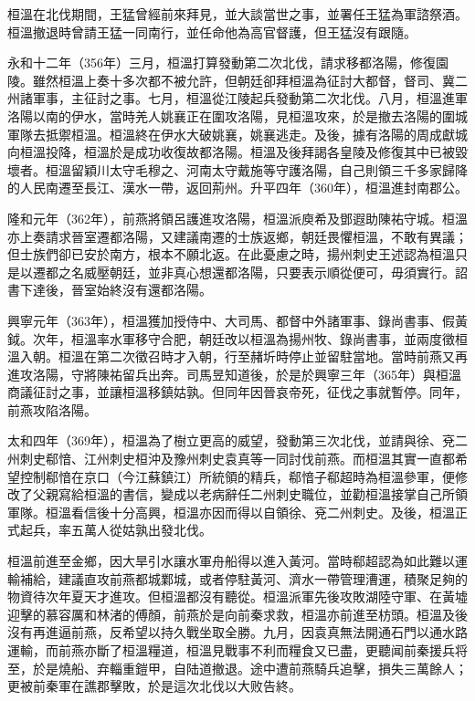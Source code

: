 桓溫在北伐期間，王猛曾經前來拜見，並大談當世之事，並署任王猛為軍諮祭酒。桓溫撤退時曾請王猛一同南行，並任命他為高官督護，但王猛沒有跟隨。

永和十二年（356年）三月，桓溫打算發動第二次北伐，請求移都洛陽，修復園陵。雖然桓溫上奏十多次都不被允許，但朝廷卻拜桓溫為征討大都督，督司、冀二州諸軍事，主征討之事。七月，桓溫從江陵起兵發動第二次北伐。八月，桓溫進軍洛陽以南的伊水，當時羌人姚襄正在圍攻洛陽，見桓溫攻來，於是撤去洛陽的圍城軍隊去抵禦桓溫。桓溫終在伊水大破姚襄，姚襄逃走。及後，據有洛陽的周成獻城向桓溫投降，桓溫於是成功收復故都洛陽。桓溫及後拜謁各皇陵及修復其中已被毀壞者。桓溫留穎川太守毛穆之、河南太守戴施等守護洛陽，自己則領三千多家歸降的人民南遷至長江、漢水一帶，返回荊州。升平四年（360年），桓溫進封南郡公。

隆和元年（362年），前燕將領呂護進攻洛陽，桓溫派庾希及鄧遐助陳祐守城。桓溫亦上奏請求晉室遷都洛陽，又建議南遷的士族返鄉，朝廷畏懼桓溫，不敢有異議；但士族們卻已安於南方，根本不願北返。在此憂慮之時，揚州刺史王述認為桓溫只是以遷都之名威壓朝廷，並非真心想還都洛陽，只要表示順從便可，毋須實行。詔書下達後，晉室始終沒有還都洛陽。

興寧元年（363年），桓溫獲加授侍中、大司馬、都督中外諸軍事、錄尚書事、假黃鉞。次年，桓溫率水軍移守合肥，朝廷改以桓溫為揚州牧、錄尚書事，並兩度徵桓溫入朝。桓溫在第二次徵召時才入朝，行至赭圻時停止並留駐當地。當時前燕又再進攻洛陽，守將陳祐留兵出奔。司馬昱知道後，於是於興寧三年（365年）與桓溫商議征討之事，並讓桓溫移鎮姑孰。但同年因晉哀帝死，征伐之事就暫停。同年，前燕攻陷洛陽。

太和四年（369年），桓溫為了樹立更高的威望，發動第三次北伐，並請與徐、兗二州刺史郗愔、江州刺史桓沖及豫州刺史袁真等一同討伐前燕。而桓溫其實一直都希望控制郗愔在京口（今江蘇鎮江）所統領的精兵，郗愔子郗超時為桓溫參軍，便修改了父親寫給桓溫的書信，變成以老病辭任二州刺史職位，並勸桓溫接掌自己所領軍隊。桓溫看信後十分高興，桓溫亦因而得以自領徐、兗二州刺史。及後，桓溫正式起兵，率五萬人從姑孰出發北伐。

桓溫前進至金鄉，因大旱引水讓水軍舟船得以進入黃河。當時郗超認為如此難以運輸補給，建議直攻前燕都城鄴城，或者停駐黃河、濟水一帶管理漕運，積聚足夠的物資待次年夏天才進攻。但桓溫都沒有聽從。桓溫派軍先後攻敗湖陸守軍、在黃墟迎擊的慕容厲和林渚的傅顏，前燕於是向前秦求救，桓溫亦前進至枋頭。桓溫及後沒有再進逼前燕，反希望以持久戰坐取全勝。九月，因袁真無法開通石門以通水路運輸，而前燕亦斷了桓溫糧道，桓溫見戰事不利而糧食又已盡，更聽闻前秦援兵将至，於是燒船、弃輜重鎧甲，自陆道撤退。途中遭前燕騎兵追擊，損失三萬餘人；更被前秦軍在譙郡擊敗，於是這次北伐以大败告終。

